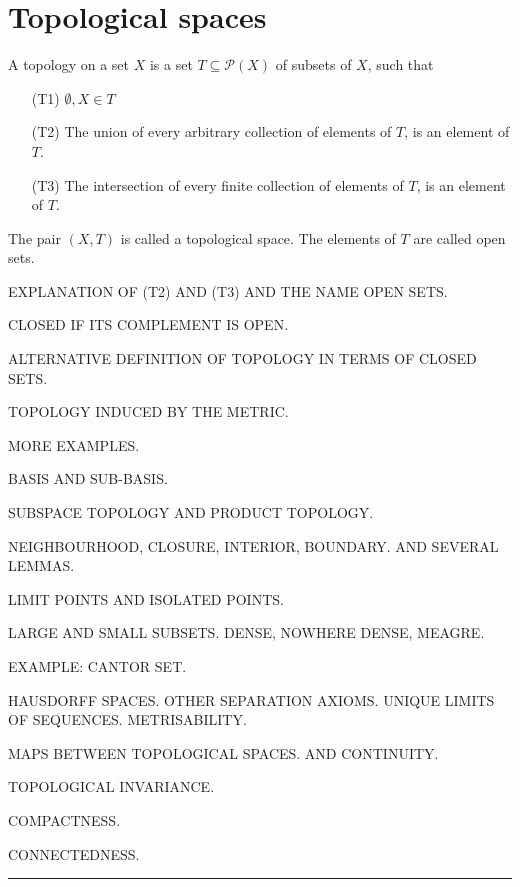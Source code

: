 \documentclass[draft]{penrose}
\begin{document}
\section{Topological spaces}

\begin{ndfn}
  A topology on a set $X$ is a set $T \subseteq \mathcal{P}(X)$ of subsets of $X$, such that
  \begin{enumerate}
  \item[(T1)] $\emptyset, X \in T$
  \item[(T2)] The union of every arbitrary collection of elements of $T$, is an element of $T$.
  \item[(T3)] The intersection of every finite collection of elements of $T$, is an element of $T$.
  \end{enumerate}
  The pair $(X,T)$ is called a topological space. The elements of $T$ are called open sets.
\end{ndfn}

EXPLANATION OF (T2) AND (T3) AND THE NAME OPEN SETS.

CLOSED IF ITS COMPLEMENT IS OPEN.

ALTERNATIVE DEFINITION OF TOPOLOGY IN TERMS OF CLOSED SETS.

TOPOLOGY INDUCED BY THE METRIC.

MORE EXAMPLES.

BASIS AND SUB-BASIS.

SUBSPACE TOPOLOGY AND PRODUCT TOPOLOGY.

NEIGHBOURHOOD, CLOSURE, INTERIOR, BOUNDARY. AND SEVERAL LEMMAS.

LIMIT POINTS AND ISOLATED POINTS.

LARGE AND SMALL SUBSETS. DENSE, NOWHERE DENSE, MEAGRE.

EXAMPLE: CANTOR SET.

HAUSDORFF SPACES. OTHER SEPARATION AXIOMS. UNIQUE LIMITS OF SEQUENCES. METRISABILITY.

MAPS BETWEEN TOPOLOGICAL SPACES. AND CONTINUITY.

TOPOLOGICAL INVARIANCE.

COMPACTNESS.

CONNECTEDNESS.

\begin{center}
  \vspace*{0.5em}
  \rule{0.8\textwidth}{0.8pt}
\end{center}

\nocite{*}
{\small }
\end{document}
